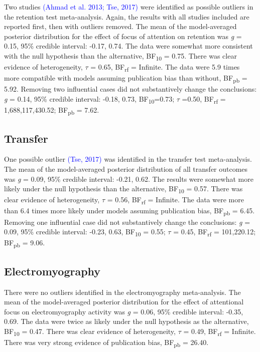 \documentclass[
  man, donotrepeattitle,floatsintext]{apa7}
\begin{document}
Two studies \textcolor{blue}{(Ahmad et al. 2013; Tse, 2017)} were identified as possible outliers in the retention test meta-analysis. Again, the results with all studies included are reported first, then with outliers removed. The mean of the model-averaged posterior distribution for the effect of focus of attention on retention was \emph{g} = 0.15, 95\% credible interval: -0.17, 0.74. The data were somewhat more consistent with the null hypothesis than the alternative, BF\textsubscript{10} = 0.75. There was clear evidence of heterogeneity, \(\tau\) = 0.65, BF\textsubscript{rf} = Infinite. The data were 5.9 times more compatible with models assuming publication bias than without, BF\textsubscript{pb} = 5.92. Removing two influential cases did not substantively change the conclusions: \emph{g} = 0.14, 95\% credible interval: -0.18, 0.73, BF\textsubscript{10}=0.73; \(\tau\) =0.50, BF\textsubscript{rf} = 1,688,117,430.52; BF\textsubscript{pb} = 7.62.

\hypertarget{transfer}{%
\subsection{Transfer}\label{transfer}}

One possible outlier \textcolor{blue}{(Tse, 2017)} was identified in the transfer test meta-analysis. The mean of the model-averaged posterior distribution of all transfer outcomes was \emph{g} = 0.09, 95\% credible interval: -0.21, 0.62. The results were somewhat more likely under the null hypothesis than the alternative, BF\textsubscript{10} = 0.57. There was clear evidence of heterogeneity, \(\tau\) = 0.56, BF\textsubscript{rf} = Infinite. The data were more than 6.4 times more likely under models assuming publication bias, BF\textsubscript{pb} = 6.45. Removing one influential case did not substantively change the conclusions: \emph{g} = 0.09, 95\% credible interval: -0.23, 0.63, BF\textsubscript{10} = 0.55; \(\tau\) = 0.45, BF\textsubscript{rf} = 101,220.12; BF\textsubscript{pb} = 9.06.

\hypertarget{electromyography}{%
\subsection{Electromyography}\label{electromyography}}

There were no outliers identified in the electromyography meta-analysis. The mean of the model-averaged posterior distribution for the effect of attentional focus on electromyography activity was \emph{g} = 0.06, 95\% credible interval: -0.35, 0.69. The data were twice as likely under the null hypothesis as the alternative, BF\textsubscript{10} = 0.47. There was clear evidence of heterogeneity, \(\tau\) = 0.49, BF\textsubscript{rf} = Infinite. There was very strong evidence of publication bias, BF\textsubscript{pb} = 26.40.
\end{document}
